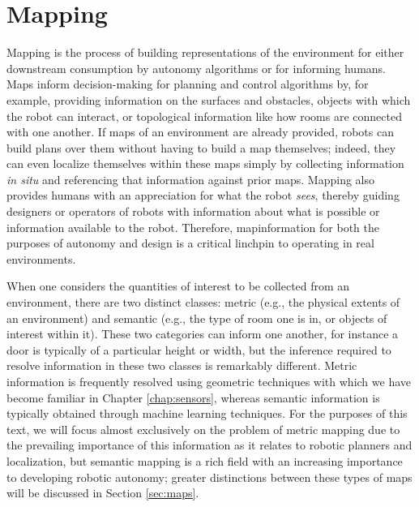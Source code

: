 \chapter{Mapping}\label{chap:mapping}
Mapping is the process of building representations of the environment for
either downstream consumption by autonomy algorithms or for informing humans.
Maps inform decision-making for planning and control algorithms by, for
example, providing information on the surfaces and obstacles, objects with
which the robot can interact, or topological information like how rooms are
connected with one another. If maps of an environment are already provided,
robots can build plans over them without having to build a map themselves;
indeed, they can even localize themselves within these maps simply by
collecting information \emph{in situ} and referencing that information against
prior maps. Mapping also provides humans with an appreciation for what the
robot \emph{sees}, thereby guiding designers or operators of robots with
information about what is possible or information available to the robot.
Therefore, mapinformation for both the purposes of autonomy and design is a
critical linchpin to operating in real environments.

When one considers the quantities of interest to be collected from an
environment, there are two distinct classes: metric (e.g., the physical extents
of an environment) and semantic (e.g., the type of room one is in, or objects
of interest within it). These two categories can inform one another, for
instance a door is typically of a particular height or width, but the inference
required to resolve information in these two classes is remarkably different.
Metric information is frequently resolved using geometric techniques with which
we have become familiar in Chapter \ref{chap:sensors}, whereas semantic
information is typically obtained through machine learning techniques. For the
purposes of this text, we will focus almost exclusively on the problem of
metric mapping due to the prevailing importance of this information as it
relates to robotic planners and localization, but semantic mapping is a rich
field with an increasing importance to developing robotic autonomy; 
greater distinctions between these types of maps will be discussed in
Section \ref{sec:maps}.

